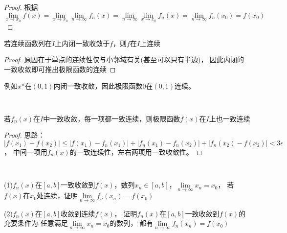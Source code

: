 \begin{proof}
  根据$\lim \limits _{x \rightarrow x_0}f(x) = \lim \limits _{x \rightarrow x_0}\lim \limits _{n \rightarrow \infty} f_n(x) = \lim \limits _{n \rightarrow \infty} \lim \limits _{x \rightarrow x_0}f_n(x) = \lim \limits _{n \rightarrow \infty} f_n(x_0) = f(x_0)$
\end{proof}

\begin{corollary}[整体连续性]
  若连续函数列在$I$上内闭一致收敛于$f$，则$f$在$I$上连续
\end{corollary}

\begin{proof}
  原因在于单点的连续性仅与小邻域有关(甚至可以只有半边)，
  因此内闭的一致收敛即可推出极限函数的连续
\end{proof}

\begin{example}
  例如$x^n$在$(0,1)$内闭一致收敛，因此极限函数$0$在$(0,1)$连续。
\end{example}

~


\begin{theorem}[一致连续性]
  若$f_n(x)$在$I$中一致收敛，每一项都一致连续，则极限函数$f(x)$在$I$上也一致连续
\end{theorem}

\begin{proof}
  思路：$|f(x_1) - f(x_2)| \leq |f(x_1) - f_n(x_1)| + |f_n(x_1) - f_n(x_2)| + |f_n(x_2) - f(x_2)| < 3\epsilon$，
  中间一项用$f_n(x)$的一致连续性，左右两项用一致收敛性。
\end{proof}

~

\begin{exercise}[函数列连续性练习]
  (1)$f_n(x)$在$[a,b]$一致收敛到$f(x)$，数列$x_n \in [a,b]$，$\lim \limits _{n \rightarrow \infty} x_n = x_0$，
  若$f(x)$在$x_0$处连续，证明$\lim \limits _{n \rightarrow \infty} f_n(x_n) = f(x_0)$

  (2)$f_n(x)$在$[a,b]$收敛到连续$f(x)$，
  证明$f_n(x)$在$[a,b]$一致收敛到$f(x)$的充要条件为
  任意满足$\lim \limits _{n \rightarrow \infty} x_n = x_0$的数列，
  都有$\lim \limits _{n \rightarrow \infty} f_n(x_n) = f(x_0)$
\end{exercise}

